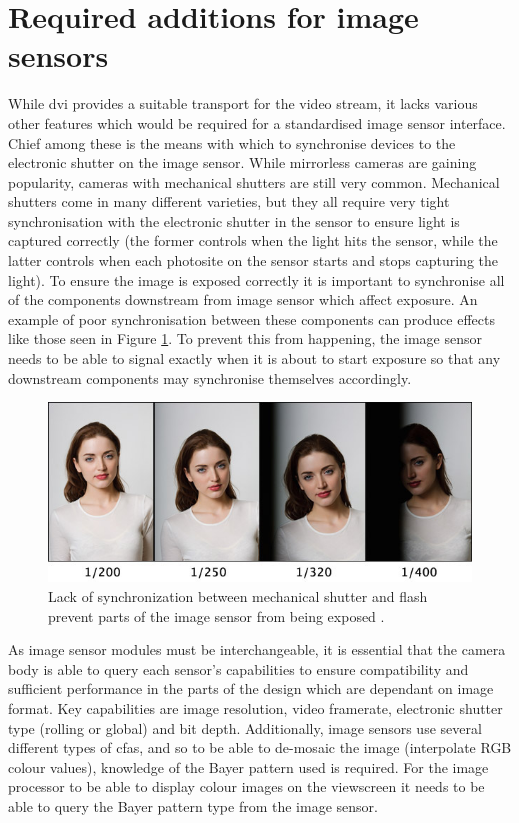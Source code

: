 \section{Required additions for image sensors}

While \gls{dvi} provides a suitable transport for the video stream, it lacks various other features which would be required for a standardised image sensor interface. Chief among these is the means with which to synchronise devices to the electronic shutter on the image sensor. While mirrorless cameras are gaining popularity, cameras with mechanical shutters are still very common. Mechanical shutters come in many different varieties, but they all require very tight synchronisation with the electronic shutter in the sensor to ensure light is captured correctly (the former controls when the light hits the sensor, while the latter controls when each photosite on the sensor starts and stops capturing the light). To ensure the image is exposed correctly it is important to synchronise all of the components downstream from image sensor which affect exposure. An example of poor synchronisation between these components can produce effects like those seen in Figure \ref{fig:flash_unsync}. To prevent this from happening, the image sensor needs to be able to signal exactly when it is about to start exposure so that any downstream components may synchronise themselves accordingly.

\begin{figure}
  \centering
  \includegraphics[width=1\textwidth]{./img/flash_unsync.jpg}
  \caption{Lack of synchronization between mechanical shutter and flash prevent parts of the image sensor from being exposed \cite{flash_sync}.}
  \label{fig:flash_unsync}
\end{figure}

As image sensor modules must be interchangeable, it is essential that the camera body is able to query each sensor's capabilities to ensure compatibility and sufficient performance in the parts of the design which are dependant on image format. Key capabilities are image resolution, video framerate, electronic shutter type (rolling or global) and bit depth. Additionally, image sensors use several different types of \glspl{cfa}, and so to be able to de-mosaic the image (interpolate RGB colour values), knowledge of the Bayer pattern used is required. For the image processor to be able to display colour images on the viewscreen it needs to be able to query the Bayer pattern type from the image sensor. 
 
